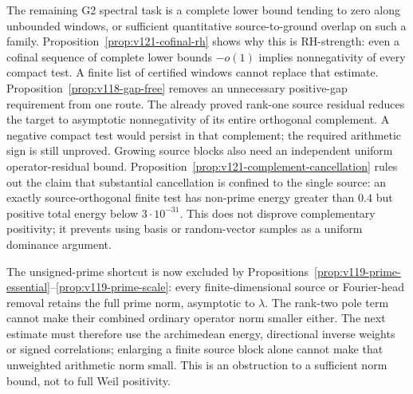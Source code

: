 \documentclass[11pt]{article}
\theoremstyle{remark}
\begin{document}
The remaining G2 spectral task is a complete lower bound tending to
zero along unbounded windows, or sufficient quantitative source-to-ground
overlap on such a family. Proposition~\ref{prop:v121-cofinal-rh}
shows why this is RH-strength: even a cofinal sequence of complete
lower bounds $-o(1)$ implies nonnegativity of every compact test.
A finite list of certified windows cannot replace that estimate.
Proposition~\ref{prop:v118-gap-free} removes an unnecessary positive-gap
requirement from one route. The already proved rank-one source residual
reduces the target to asymptotic nonnegativity of its entire orthogonal
complement. A negative compact test would persist in that complement;
the required arithmetic sign is still unproved. Growing source blocks
also need an independent uniform operator-residual bound.
Proposition~\ref{prop:v121-complement-cancellation} rules out the
claim that substantial cancellation is confined to the single source:
an exactly source-orthogonal finite test has non-prime energy greater
than $0.4$ but positive total energy below $3\cdot10^{-31}$.
This does not disprove complementary positivity; it prevents using
basis or random-vector samples as a uniform dominance argument.

The unsigned-prime shortcut is now excluded by
Propositions~\ref{prop:v119-prime-essential}--\ref{prop:v119-prime-scale}:
every finite-dimensional source or Fourier-head removal retains the
full prime norm, asymptotic to $\lambda$. The rank-two pole term cannot
make their combined ordinary operator norm smaller either. The next
estimate must therefore use the archimedean energy, directional inverse
weights or signed correlations; enlarging a finite source block alone
cannot make that unweighted arithmetic norm small. This is an
obstruction to a sufficient norm bound, not to full Weil positivity.
\end{document}
